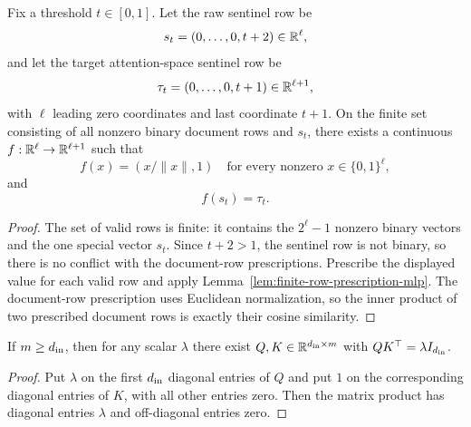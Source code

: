 \begin{lemma}
  \label{lem:normalize-end-token-mlp}
  Fix a threshold $t\in[0,1]$.  Let the raw sentinel row be
  \[
    s_t=(0,\ldots,0,t+2)\in\mathbb{R}^\ell,
  \]
  and let the target attention-space sentinel row be
  \[
    \tau_t=(0,\ldots,0,t+1)\in\mathbb{R}^{\ell+1},
  \]
  with $\ell$ leading zero coordinates and last coordinate $t+1$.  On the
  finite set consisting of all nonzero binary document rows and $s_t$, there
  exists a continuous $f:\mathbb{R}^\ell\to\mathbb{R}^{\ell+1}$ such that
  \[
    f(x)=(x/\|x\|,1)\quad\text{for every nonzero }x\in\{0,1\}^{\ell},
  \]
  and
  \[
    f(s_t)=\tau_t.
  \]
\end{lemma}
\begin{proof}
  The set of valid rows is finite: it contains the $2^\ell-1$ nonzero binary
  vectors and the one special vector $s_t$.  Since $t+2>1$, the sentinel row is
  not binary, so there is no conflict with the document-row prescriptions.
  Prescribe the displayed value for each valid row and apply
  Lemma~\ref{lem:finite-row-prescription-mlp}.  The document-row prescription
  uses Euclidean normalization, so the inner product of two prescribed document
  rows is exactly their cosine similarity.
\end{proof}

\begin{lemma}
  \label{lem:attention-factorization}
  If $m\geq d_{\rm in}$, then for any scalar $\lambda$ there exist
  $Q,K\in\mathbb{R}^{d_{\rm in}\times m}$ with $QK^\top=\lambda I_{d_{\rm in}}$.
\end{lemma}
\begin{proof}
  Put $\lambda$ on the first $d_{\rm in}$ diagonal entries of $Q$ and put $1$
  on the corresponding diagonal entries of $K$, with all other entries zero.
  Then the matrix product has diagonal entries $\lambda$ and off-diagonal
  entries zero.
\end{proof}


